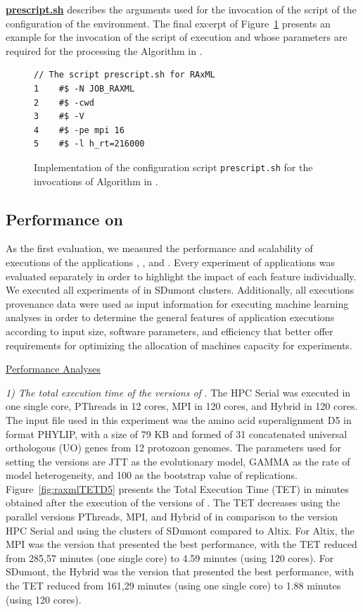 \underline{\textbf{prescript.sh}} describes the arguments used for the invocation of the script of the configuration of the environment. The final excerpt of Figure~\ref{fig:prescriptshcoderaxml} presents an example for the invocation of the script of execution and whose parameters are required for the processing the Algorithm \raxml in \system. 

 \begin{figure}[!t]
 \begin{lstlisting}[style=myScalastyle]
 // The script prescript.sh for RAxML
1    #$ -N JOB_RAXML
2    #$ -cwd
3    #$ -V
4    #$ -pe mpi 16
5    #$ -l h_rt=216000
\end{lstlisting}
\vspace{-10px}
\caption{Implementation of the configuration script \texttt{prescript.sh} for the invocations of Algorithm \raxml in \system.}
\label{fig:prescriptshcoderaxml}
\end{figure}


\subsection{Performance on \system}
As the first \system evaluation, we measured the performance and scalability of executions of the applications \raxml, \sci, and \swift. Every experiment of applications was evaluated separately in order to highlight the impact of each feature individually. We executed all experiments of \system in SDumont clusters. Additionally, all executions provenance data were used as input information for executing machine learning analyses in order to determine the general features of application executions according to input size, software parameters, and efficiency that better offer requirements for optimizing the allocation of machines capacity for experiments.

\vspace{5px}
\noindent
\underline{\textbf{\raxml} Performance Analyses}

\textit{1) The total execution time of the versions of \raxml}. The \raxml HPC Serial was executed in one single core, \raxml PThreads in 12 cores, \raxml MPI in 120 cores, and \raxml Hybrid in 120 cores. The input file used in this experiment was the amino acid superalignment D5 in format PHYLIP, with a size of 79 KB and formed of 31 concatenated universal orthologous (UO) genes from 12 protozoan genomes. The parameters used for setting the \raxml versions are JTT as the evolutionary model, GAMMA as the rate of model heterogeneity, and 100 as the bootstrap value of replications. Figure~\ref{fig:raxmlTETD5} presents the Total Execution Time (TET) in minutes obtained after the execution of the versions of \raxml. The TET decreases using the parallel versions PThreads, MPI, and Hybrid of \raxml in comparison to the version \raxml HPC Serial and using the clusters of SDumont compared to Altix. For Altix, the \raxml MPI was the version that presented the best performance, with the TET reduced from 285,57 minutes (one single core) to 4.59 minutes (using 120 cores). For SDumont, the \raxml Hybrid was the version that presented the best performance, with the TET reduced from 161,29 minutes (using one single core) to 1.88 minutes (using 120 cores). 

